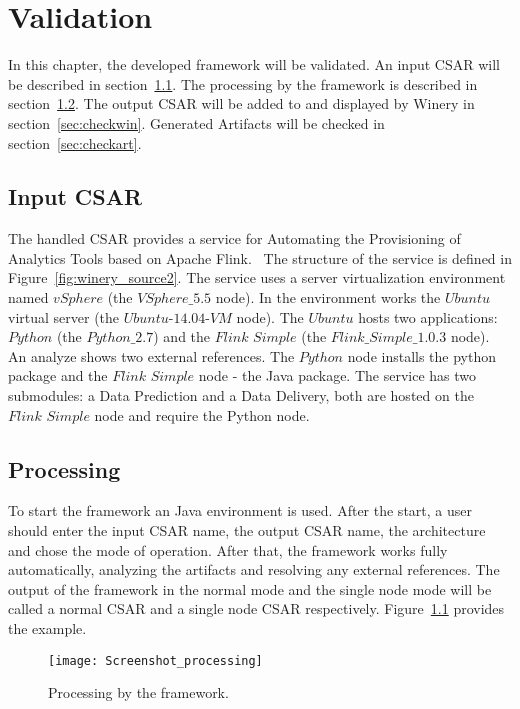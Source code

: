
\chapter{Validation}\label{chap:check}
In this chapter, the developed framework will be validated.
An input CSAR will be described in section~\ref{sec:inputcsar}.
The processing by the framework is described in section~\ref{sec:process}.
The output CSAR will be added to and displayed by Winery in section~\ref{sec:checkwin}.
Generated Artifacts will be checked in section~\ref{sec:checkart}.

\section{Input CSAR}\label{sec:inputcsar}
The handled CSAR provides a service for Automating the Provisioning of Analytics Tools based on Apache Flink.~\cite{csar_test}
The structure of the service is defined in Figure~\ref{fig:winery_source2}. 
The service uses a server virtualization environment named $vSphere$ (the $VSphere\_5.5$ node). 
In the environment works the $Ubuntu$ virtual server (the $Ubuntu$-$14.04$-$VM$ node).
The $Ubuntu$ hosts two applications: $Python$ (the $Python\_2.7$) and the $Flink$ $Simple$ (the $Flink\_Simple\_1.0.3$ node).
An analyze shows two external references. The $Python$ node installs the python package and the $Flink$ $Simple$ node - the Java package.
The service has two submodules: a Data Prediction and a Data Delivery, both are hosted on the $Flink$ $Simple$ node and require the Python node. 

\section{Processing}\label{sec:process}
To start the framework an Java environment is used.
After the start, a user should enter the input CSAR name, the output CSAR name, the architecture and chose the mode of operation.
After that, the framework works fully automatically, analyzing the artifacts and resolving any external references.
The output of the framework in the normal mode and the single node mode will be called a normal CSAR and a single node CSAR respectively.
Figure~\ref{fig:process} provides the example.
\begin{figure}[ht]   
	\centering
	\texttt{[image: Screenshot\_processing]}
	\caption{Processing by the framework.}
	\label{fig:process}
\end{figure}

